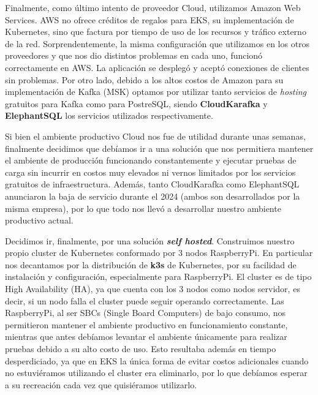 Finalmente, como último intento de proveedor Cloud, utilizamos Amazon Web Services. AWS no ofrece créditos de regalos para EKS, su implementación de Kubernetes, sino que factura por tiempo
de uso de los recursos y tráfico externo de la red. Sorprendentemente, la misma configuración que utilizamos en los otros proveedores y que nos dio distintos problemas en cada uno, funcionó correctamente
en AWS. La aplicación se desplegó y aceptó conexiones de clientes sin problemas. Por otro lado, debido a los altos costos de Amazon para su implementación de Kafka (MSK) optamos por utilizar
tanto servicios de \textit{hosting} gratuitos para Kafka como para PostreSQL, siendo \textbf{CloudKarafka} y \textbf{ElephantSQL} los servicios utilizados respectivamente.

Si bien el ambiente productivo Cloud nos fue de utilidad durante unas semanas, finalmente decidimos que debíamos ir a una solución que nos permitiera mantener el ambiente de producción funcionando constantemente
y ejecutar pruebas de carga sin incurrir en costos muy elevados ni vernos limitados por los servicios gratuitos de infraestructura. Además, tanto CloudKarafka como ElephantSQL anunciaron la baja de servicio
durante el 2024 (ambos son desarrollados por la misma empresa), por lo que todo nos llevó a desarrollar nuestro ambiente productivo actual.

Decidimos ir, finalmente, por una solución \textbf{\textit{self hosted}}. Construimos nuestro propio cluster de Kubernetes conformado por 3 nodos RaspberryPi. En particular nos decantamos por la distribución de
\textbf{k3s} de Kubernetes, por su facilidad de instalación y configuración, especialmente para RaspberryPi. El cluster es de tipo High Availability (HA), ya que cuenta con los 3 nodos como nodos servidor, es decir,
si un nodo falla el cluster puede seguir operando correctamente. Las RaspberryPi, al ser SBCs (Single Board Computers) de bajo consumo, nos permitieron mantener el ambiente productivo en funcionamiento
constante, mientras que antes debíamos levantar el ambiente únicamente para realizar pruebas debido a su alto costo de uso. Esto resultaba además en tiempo desperdiciado, ya que en EKS la única forma de evitar costos adicionales
cuando no estuviéramos utilizando el cluster era eliminarlo, por lo que debíamos esperar a su recreación cada vez que quisiéramos utilizarlo.

